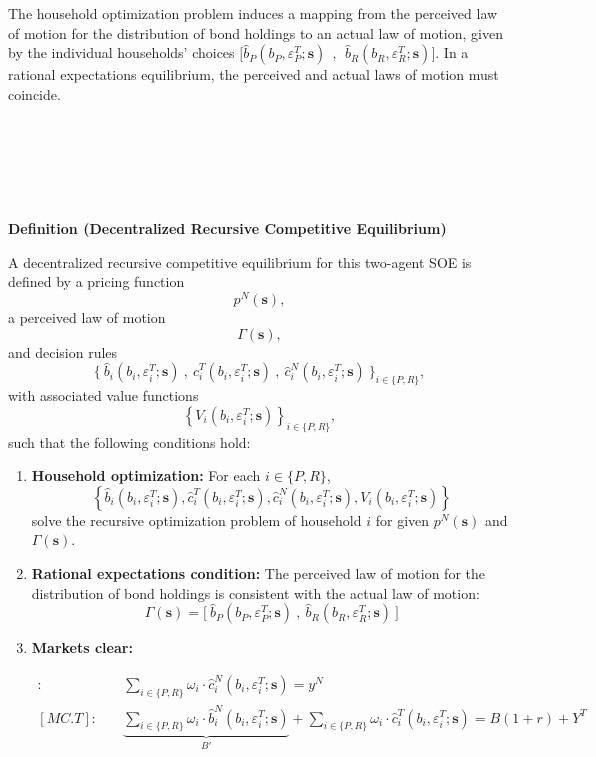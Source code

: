 \documentclass[11pt]{article}
\begin{document}
The household optimization problem induces a mapping from the perceived
law of motion for the distribution of bond holdings to an actual law of motion,
given by the individual households' choices $\Big[\widehat b_P(b_P,\varepsilon_P^T;\mathbf{s}) \ \ , \ \
\widehat b_R(b_R,\varepsilon_R^T;\mathbf{s})\Big]$.
In a rational expectations equilibrium, the perceived and actual laws of
motion must coincide.


\ 

\ 

\ 

\textbf{Definition (Decentralized Recursive Competitive Equilibrium)}

A decentralized recursive competitive equilibrium for this two-agent SOE is defined by a pricing function
\[
p^N(\mathbf{s}),
\]
a perceived law of motion
\[
\Gamma(\mathbf{s}),
\]
and decision rules
\[
\Big\{ \ 
\widehat b_i(b_i,\varepsilon_i^T;\mathbf{s}) \ , \ 
\widehat c_i^T(b_i,\varepsilon_i^T;\mathbf{s}) \ , \ 
\widehat c_i^N(b_i,\varepsilon_i^T;\mathbf{s}) \ 
\Big\}_{i\in\{P,R\}},
\]
with associated value functions
\[
\left\{
V_i(b_i,\varepsilon_i^T;\mathbf{s})
\right\}_{i\in\{P,R\}},
\]
such that the following conditions hold:

\begin{enumerate}

\item[(i)] \textbf{Household optimization:}
For each $i\in\{P,R\}$,
\[
\left\{
\widehat b_i(b_i,\varepsilon_i^T;\mathbf{s}),
\widehat c_i^T(b_i,\varepsilon_i^T;\mathbf{s}),
\widehat c_i^N(b_i,\varepsilon_i^T;\mathbf{s}),
V_i(b_i,\varepsilon_i^T;\mathbf{s})
\right\}
\]
solve the recursive optimization problem of household $i$ for given
$p^N(\mathbf{s})$ and $\Gamma(\mathbf{s})$.

\item[(ii)] \textbf{Rational expectations condition:}
The perceived law of motion for the distribution of bond holdings is consistent
with the actual law of motion:
\[
\Gamma(\mathbf{s})
= \Big[ \ \widehat b_P(b_P,\varepsilon_P^T;\mathbf{s})\ , \ 
\widehat b_R(b_R,\varepsilon_R^T;\mathbf{s}) \ \Big]
\]


\item[(iii)] \textbf{Markets clear:}

\begin{align*}
    [MC.N]: \quad & \sum_{i\in\{P,R\}}\omega_i \cdot \widehat c_i^N(b_i,\varepsilon_i^T;\mathbf{s})=y^N \\
     [MC.T]: \quad &  \underbrace{\sum_{i\in\{P,R\}}\omega_i \cdot \widehat b_i^N(b_i,\varepsilon_i^T;\mathbf{s})}_{B'} +\sum_{i\in\{P,R\}}\omega_i \cdot \widehat c_i^T(b_i,\varepsilon_i^T;\mathbf{s})=B(1+r)+Y^T
\end{align*}
\end{enumerate}

 
\end{document}

